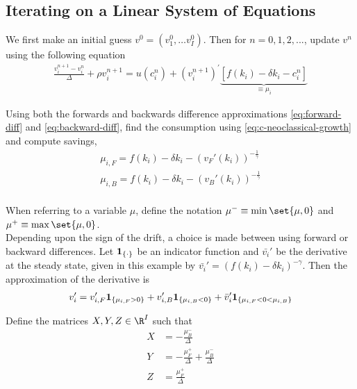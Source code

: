 \documentclass[11pt]{etk-article}
\begin{document}
\subsection{Iterating on a Linear System of Equations}
We first make an initial guess $v^0 = (v_1^0, \dots v_I^0)$. Then for $n = 0, 1, 2, ...$,  update $v^n$ using the following equation
\begin{align}
	\frac{v_i^{n+1}-v_i^{n}}{\Delta} + \rho v_i^{n+1} = u(c_i^n) + (v_i^{n+1})^{'}  \underbrace{\left[f(k_i) - \delta k_i - c_i^n\right]}_{\equiv \mu_i}\label{eq:fd-approx-capital}
\end{align}

Using both the forwards and backwards difference approximations \cref{eq:forward-diff} and \cref{eq:backward-diff}, find the consumption using \cref{eq:c-neoclassical-growth} and compute savings,
\begin{align}
\mu_{i,F} = f(k_i) - \delta k_i - \left(v_F'(k_i) \right)^{-\frac{1}{\gamma}}\\
\mu_{i,B} = f(k_i) - \delta k_i - \left(v_B'(k_i) \right)^{-\frac{1}{\gamma}}\\
\end{align}

When referring to a variable $\mu$, define the notation $\mu^{-} \equiv \min\set{\mu,0}$ and $\mu^{+} \equiv \max\set{\mu,0}$. \\
Depending upon the sign of the drift, a choice is made between using forward or backward differences. Let $\bold{1}_{\{ \cdot \}}$ be an indicator function and  $\bar{v_i}' $ be the derivative at the steady state, given in this example by $\bar{v_i}' = (f(k_i)-\delta k_i)^{-\gamma}$. Then the approximation of the derivative is 
\begin{align}
v_i'=v'_{i,F}\bold{1}_{\{ \mu_{i,F} > 0\}}+v'_{i,B}\bold{1}_{\{ \mu_{i,B}<0 \}}+\bar{v}' _i\bold{1}_{\{ \mu_{i,F}<0<\mu_{i,B} \}}
\end{align}

Define the matrices $X, Y, Z \in \R^{I} $ such that 
\begin{align}
	X &= -\frac {\mu^{-} _B}{\Delta}\label{eq:X} \\
	Y &= -\frac {\mu^{+} _F}{\Delta} + \frac {\mu^{-} _B}{\Delta}\label{eq:Y} \\
	Z &= \frac {\mu^{+} _F}{\Delta}\label{eq:Z}
\end{align}
\end{document}

